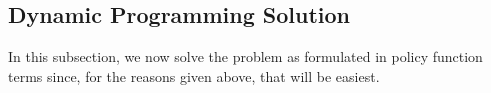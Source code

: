 \documentclass[a4paper,12pt]{scrartcl}
\begin{document}
\subsection{Dynamic Programming Solution}

In this subsection, we now solve the problem as formulated in policy
function terms since, for the reasons given above, that will be
easiest. 









% 
\end{document}
